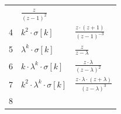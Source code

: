 \documentclass[11pt]{article}
\begin{document}
\begin{longtable}[]{@{}lll@{}}
\begin{minipage}[t]{0.28\columnwidth}
\end{minipage} & \begin{minipage}[t]{0.58\columnwidth}\raggedright\strut
\(\frac{z}{(z-1)^2}\)\strut
\end{minipage}\tabularnewline
\begin{minipage}[t]{0.05\columnwidth}\raggedright\strut
4\strut
\end{minipage} & \begin{minipage}[t]{0.28\columnwidth}\raggedright\strut
\(k^2 \cdot \sigma[k]\)\strut
\end{minipage} & \begin{minipage}[t]{0.58\columnwidth}\raggedright\strut
\(\frac{z\cdot(z+1)}{(z-1)^{-3}}\)\strut
\end{minipage}\tabularnewline
\begin{minipage}[t]{0.05\columnwidth}\raggedright\strut
5\strut
\end{minipage} & \begin{minipage}[t]{0.28\columnwidth}\raggedright\strut
\(\lambda^k \cdot \sigma[k]\)\strut
\end{minipage} & \begin{minipage}[t]{0.58\columnwidth}\raggedright\strut
\(\frac{z}{z-\lambda}\)\strut
\end{minipage}\tabularnewline
\begin{minipage}[t]{0.05\columnwidth}\raggedright\strut
6\strut
\end{minipage} & \begin{minipage}[t]{0.28\columnwidth}\raggedright\strut
\(k\cdot\lambda^k\cdot\sigma[k]\)\strut
\end{minipage} & \begin{minipage}[t]{0.58\columnwidth}\raggedright\strut
\(\frac{z\cdot\lambda}{(z-\lambda)^2}\)\strut
\end{minipage}\tabularnewline
\begin{minipage}[t]{0.05\columnwidth}\raggedright\strut
7\strut
\end{minipage} & \begin{minipage}[t]{0.28\columnwidth}\raggedright\strut
\(k^2\cdot\lambda^k\cdot\sigma[k]\)\strut
\end{minipage} & \begin{minipage}[t]{0.58\columnwidth}\raggedright\strut
\(\frac{z\cdot\lambda\cdot(z+\lambda)}{(z-\lambda)^3}\)\strut
\end{minipage}\tabularnewline
\begin{minipage}[t]{0.05\columnwidth}\raggedright\strut
8\strut

\end{minipage}
\end{longtable}
\end{document}
